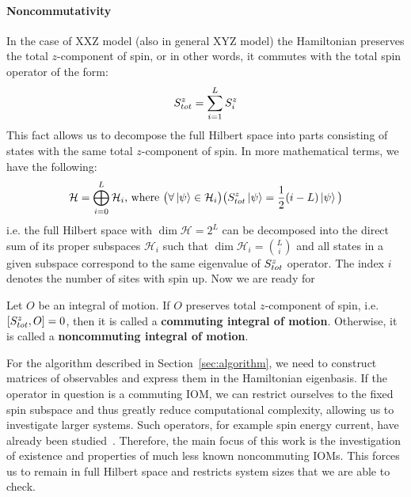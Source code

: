 \paragraph{Noncommutativity}In the case of XXZ model (also in general XYZ model) the Hamiltonian preserves the total \(z\)-component of spin,
or in other words, it commutes with the total spin operator of the form:
\begin{equation*}
  S^{z}_{tot} = \sum_{i = 1}^{L} S^{z}_i
\end{equation*} 
This fact allows us to decompose the full Hilbert space into parts consisting of states with the same total \(z\)-component
of spin. In more mathematical terms, we have the following:
\begin{equation*}
  \mathcal{H} = \bigoplus_{i = 0}^{L} \mathcal{H}_i \text{, where } \big(\forall \ket{\psi} \in \mathcal{H}_i \big) \big(S^{z}_{tot} \ket{\psi} = \frac{1}{2}(i-L) \ket{\psi} \big)
\end{equation*}
i.e. the full Hilbert space with \(\dim{\mathcal{H}} = 2^L\) can be decomposed into the direct sum of its proper subspaces
\(\mathcal{H}_i\) such that \(\dim{\mathcal{H}_i} = \binom{L}{i}\) and all states in a given subspace correspond to the same
eigenvalue of \(S^{z}_{tot}\) operator. The index \(i\) denotes the number of sites with spin up. 
Now we are ready for
\begin{definition}
  Let \(O\) be an integral of motion. If \(O\) preserves total \(z\)-component of spin, i.e.
  \(\comm{\Sz_{tot}}{O} = 0\), then it is called a \textbf{commuting integral of motion}.
  Otherwise, it is called a \textbf{noncommuting integral of motion}.\label{def:noncomm def}
\end{definition}
For the algorithm described in Section~\ref{sec:algorithm}, we need to construct matrices of
observables and express them in the Hamiltonian eigenbasis. If the operator in question is a
commuting IOM, we can restrict ourselves to the fixed spin subspace and thus greatly reduce
computational complexity, allowing us to investigate larger systems. Such operators, for example
spin energy current, have already been studied~\autocite{Mierzejewski2015Approx}. Therefore,
the main focus of this work is the investigation of existence and properties of much less known
noncommuting IOMs. This forces us to remain in full Hilbert space and restricts system sizes
that we are able to check.


